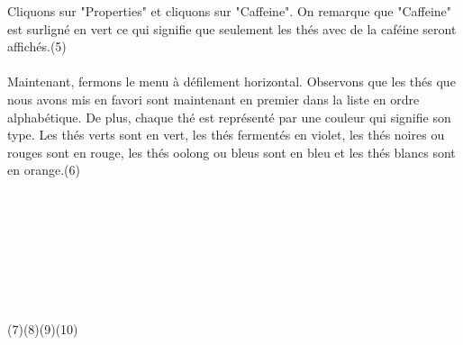 \documentclass[a4paper,12pt]{article}
\begin{document}
\begin{spacing}{1}
	Cliquons sur "Properties" et cliquons sur "Caffeine". On remarque que "Caffeine" est surligné en vert ce qui signifie que seulement les thés avec de la caféine seront affichés.(5)\\\\
	Maintenant, fermons le menu à défilement horizontal. Observons que les thés que nous avons mis en favori sont maintenant en premier dans la liste en ordre alphabétique.
	De plus, chaque thé est représenté par une couleur qui signifie son type. Les thés verts sont en vert, les thés fermentés en violet, les thés noires ou rouges sont en rouge, les thés oolong ou bleus sont en bleu et les thés blancs sont en orange.(6)
	\\\\\\\\\\\\\\\\\\
	(7)\space\space\space\space\space\space\space\space\space\space\space\space\space\space\space\space\space\space\space\space\space\space\space\space\space(8)\space\space\space\space\space\space\space\space\space\space\space\space\space\space\space\space\space\space\space\space\space\space\space\space(9)\space\space\space\space\space\space\space\space\space\space\space\space\space\space\space\space\space\space\space\space\space\space\space\space\space(10)\\

\end{spacing}
\end{document}

